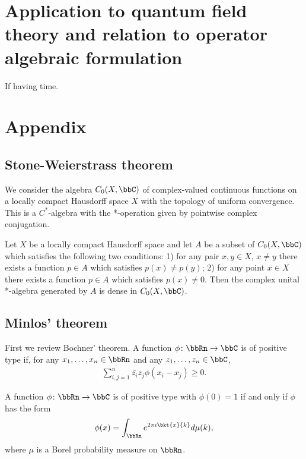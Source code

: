 \documentclass[openany, a4paper, oneside]{jsbook}
\begin{document}
\section{Application to quantum field theory and relation to operator algebraic formulation}

If having time.
\section{Appendix}

\subsection{Stone-Weierstrass theorem}

We consider the algebra $C_0 (X, \bbC)$ of complex-valued continuous functions on
a locally compact Hausdorff space $X$ with the topology of uniform convergence.
This is a $C^*$-algebra with the *-operation given by pointwise complex conjugation.
\begin{thm}
 Let $X$ be a locally compact Hausdorff space and let $A$ be a subset of $C_0 (X, \bbC)$ which satisfies the following two conditions:
 1) for any pair $x, y \in X$, $x \neq y$ there exists a function $p \in A$ which satisfies $p (x) \neq p (y)$;
 2) for any point $x \in X$ there exists a function $p \in A$ which satisfies $p (x) \neq 0$.
 Then the complex unital *-algebra generated by $A$ is dense in $C_0 (X, \bbC)$.
\end{thm}

\subsection{Minlos' theorem}

First we review Bochner' theorem.
A function $\phi \colon \bbRn \to \bbC$ is of positive type if, for any $x_1, \dots, x_n \in \bbRn$ and any $z_1, \dots, z_n \in \bbC$,
\begin{align}
 \sum_{i,j=1}^n \bar{z_i} z_j \phi (x_i - x_j) \geq 0.
\end{align}
\begin{thm}
 A function $\phi \colon \bbRn \to \bbC$ is of positive type with $\phi (0) = 1$ if and only if $\phi$ has the form
 \begin{align}
  \phi (x)
  =
  \int_{\bbRn} e^{2 \pi i \bkt{x}{k}} d \mu (k),
 \end{align}
 where $\mu$ is a Borel probability measure on $\bbRn$.
\end{thm}
\end{document}
